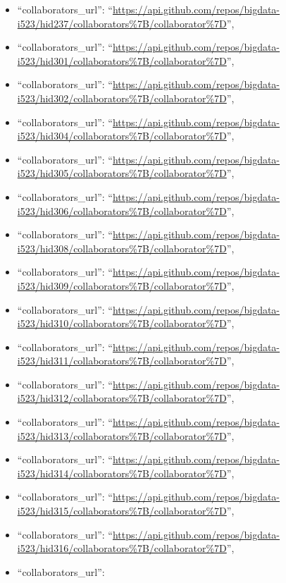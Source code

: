 \begin{itemize}
\item
  ``collaborators\_url'':
  ``\url{https://api.github.com/repos/bigdata-i523/hid237/collaborators\%7B/collaborator\%7D}'',
\item
  ``collaborators\_url'':
  ``\url{https://api.github.com/repos/bigdata-i523/hid301/collaborators\%7B/collaborator\%7D}'',
\item
  ``collaborators\_url'':
  ``\url{https://api.github.com/repos/bigdata-i523/hid302/collaborators\%7B/collaborator\%7D}'',
\item
  ``collaborators\_url'':
  ``\url{https://api.github.com/repos/bigdata-i523/hid304/collaborators\%7B/collaborator\%7D}'',
\item
  ``collaborators\_url'':
  ``\url{https://api.github.com/repos/bigdata-i523/hid305/collaborators\%7B/collaborator\%7D}'',
\item
  ``collaborators\_url'':
  ``\url{https://api.github.com/repos/bigdata-i523/hid306/collaborators\%7B/collaborator\%7D}'',
\item
  ``collaborators\_url'':
  ``\url{https://api.github.com/repos/bigdata-i523/hid308/collaborators\%7B/collaborator\%7D}'',
\item
  ``collaborators\_url'':
  ``\url{https://api.github.com/repos/bigdata-i523/hid309/collaborators\%7B/collaborator\%7D}'',
\item
  ``collaborators\_url'':
  ``\url{https://api.github.com/repos/bigdata-i523/hid310/collaborators\%7B/collaborator\%7D}'',
\item
  ``collaborators\_url'':
  ``\url{https://api.github.com/repos/bigdata-i523/hid311/collaborators\%7B/collaborator\%7D}'',
\item
  ``collaborators\_url'':
  ``\url{https://api.github.com/repos/bigdata-i523/hid312/collaborators\%7B/collaborator\%7D}'',
\item
  ``collaborators\_url'':
  ``\url{https://api.github.com/repos/bigdata-i523/hid313/collaborators\%7B/collaborator\%7D}'',
\item
  ``collaborators\_url'':
  ``\url{https://api.github.com/repos/bigdata-i523/hid314/collaborators\%7B/collaborator\%7D}'',
\item
  ``collaborators\_url'':
  ``\url{https://api.github.com/repos/bigdata-i523/hid315/collaborators\%7B/collaborator\%7D}'',
\item
  ``collaborators\_url'':
  ``\url{https://api.github.com/repos/bigdata-i523/hid316/collaborators\%7B/collaborator\%7D}'',
\item
  ``collaborators\_url'':

\end{itemize}
